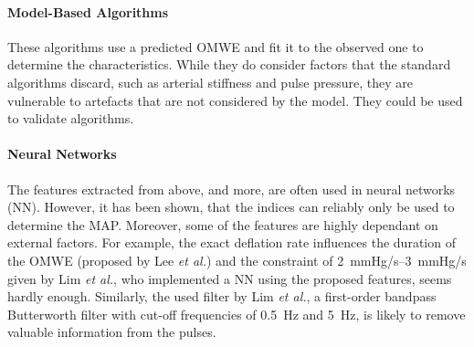 \paragraph{Model-Based Algorithms} These algorithms use a predicted OMWE and fit it to the observed one to determine the characteristics. While they do consider factors that the standard algorithms discard, such as arterial stiffness and pulse pressure, they are vulnerable to artefacts that are not considered by the model. They could be used to validate algorithms. \cite{Babbs2012}

\paragraph{Neural Networks} The features extracted from above, and more, are often used in neural networks (NN). However, it has been shown, that the indices can reliably only be used to determine the MAP. Moreover, some of the features are highly dependant on external factors. For example, the exact deflation rate influences the duration of the OMWE (proposed by Lee \textit{et al.}\cite{Lee2013}) and the constraint of \SIrange{2}{3}{\mmHg/\second} given by Lim \textit{et al.}\cite{Lim2015}, who implemented a NN using the proposed features, seems hardly enough. Similarly, the used filter by Lim \textit{et al.}, a first-order bandpass Butterworth filter with cut-off frequencies of \SI{0.5}{\Hz} and \SI{5}{\Hz}, is likely to remove valuable information from the pulses.


